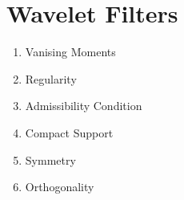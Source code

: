 \documentclass[12pt]{article}
\begin{document}
\section{Wavelet Filters}

\begin{enumerate}
    \item Vanising Moments
    \item Regularity
    \item Admissibility Condition
    \item Compact Support
    \item Symmetry
    \item Orthogonality
\end{enumerate}
\end{document}
